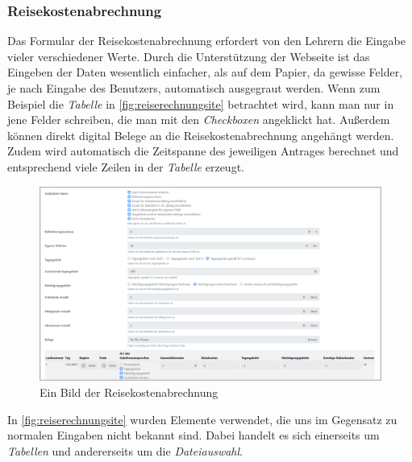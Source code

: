 \subsubsection{Reisekostenabrechnung}
\label{chapter:implementierung-frontend-komponenten-rechnung}
Das Formular der Reisekostenabrechnung erfordert von den Lehrern die Eingabe vieler verschiedener Werte. Durch die Unterstützung der Webseite ist das Eingeben der Daten wesentlich einfacher, als auf dem Papier, da gewisse Felder, je nach Eingabe des Benutzers, automatisch ausgegraut werden. Wenn zum Beispiel die \textit{Tabelle} in \autoref{fig:reiserechnungsite} betrachtet wird, kann man nur in jene Felder schreiben, die man mit den \textit{Checkboxen} angeklickt hat. Außerdem können direkt digital Belege an die Reisekostenabrechnung angehängt werden. Zudem wird automatisch die Zeitspanne des jeweiligen Antrages berechnet und entsprechend viele Zeilen in der \textit{Tabelle} erzeugt.
\begin{figure}[H]
	\centering
	\includegraphics[width=1\linewidth]{images/ldehner_implementierung/reiserechnung_1}
	\caption[Reisekostenabrechnung]{Ein Bild der Reisekostenabrechnung}
	\label{fig:reiserechnungsite}
\end{figure}
In \autoref{fig:reiserechnungsite} wurden Elemente verwendet, die uns im Gegensatz zu normalen Eingaben nicht bekannt sind. Dabei handelt es sich einerseits um \textit{Tabellen} und andererseits um die \textit{Dateiauswahl}.
\newpage
